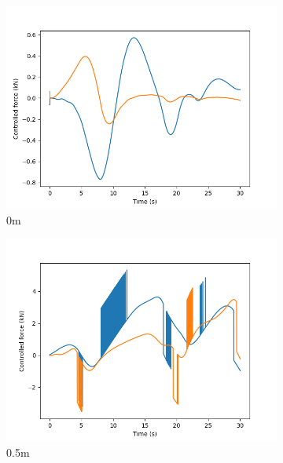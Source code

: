 \documentclass[class=article, crop=false]{standalone}
\begin{document}
\begin{figure}
    \centering
    \begin{subfigure}[b]{0.48\textwidth}
        \centering
        \includegraphics{scenario1/rov-100m/0.0m/usv_forces}
        \caption{0m}
        \label{}
    \end{subfigure}
    \hfill
    \begin{subfigure}[b]{0.48\textwidth}
        \centering
        \includegraphics{scenario1/rov-100m/0.5m/usv_forces}
        \caption{0.5m}
        \label{}
    \end{subfigure}
    \vfill
    \begin{subfigure}[b]{0.48\textwidth}
        \centering

\end{subfigure}
\end{figure}
\end{document}
